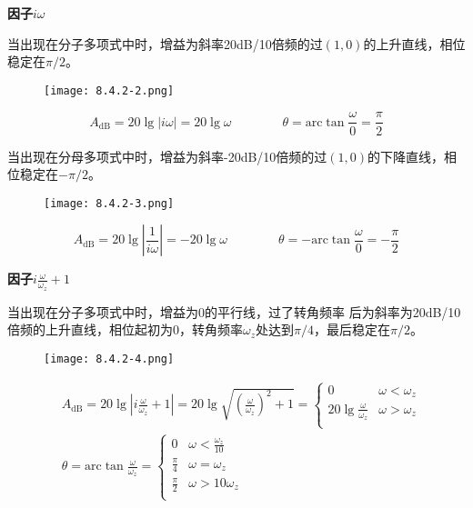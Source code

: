 {\bf 因子$i\omega $}

当出现在分子多项式中时，增益为斜率20dB/10倍频的过$\left( 1,0 \right) $的上升直线，相位稳定在$\pi /2$。

\begin{figure}[ht]
\centering
\texttt{[image: 8.4.2-2.png]}
\end{figure}
\[
A_{\mathrm{dB}}=20\lg \left| i\omega \right|=20\lg \omega \qquad \qquad \theta =\mathrm{arc}\tan \frac{\omega}{0}=\frac{\pi}{2}
\]

当出现在分母多项式中时，增益为斜率-20dB/10倍频的过$\left( 1,0 \right) $的下降直线，相位稳定在$-\pi /2$。
\begin{figure}[h]
\centering
\texttt{[image: 8.4.2-3.png]}
\end{figure}
\[
A_{\mathrm{dB}}=20\lg \left| \frac{1}{i\omega} \right|=-20\lg \omega \qquad \qquad \theta =-\mathrm{arc}\tan \frac{\omega}{0}=-\frac{\pi}{2}
\]

{\bf 因子$i\frac{\omega}{\omega _z}+1$}

当出现在分子多项式中时，增益为0的平行线，过了转角频率 后为斜率为20dB/10倍频的上升直线，相位起初为0，转角频率$\omega _z$处达到$\pi /4$，最后稳定在$\pi /2$。
\begin{figure}[h]
\centering
\texttt{[image: 8.4.2-4.png]}
\end{figure}
\begin{align*}
&A_{\mathrm{dB}}=20\lg \left| i\frac{\omega}{\omega _z}+1 \right|=20\lg \sqrt{\left( \frac{\omega}{\omega _z} \right) ^2+1}=\begin{cases}
	0 &\omega <\omega _z\\
	20\lg \frac{\omega}{\omega _z} &\omega >\omega _z\\
\end{cases} \\
&\theta =\mathrm{arc}\tan \frac{\omega}{\omega _z}=\begin{cases}
	0 &\omega <\frac{\omega _z}{10}\\
	\frac{\pi}{4} &\omega =\omega _z\\
	\frac{\pi}{2} &\omega >10\omega _z\\
\end{cases}
\end{align*}

